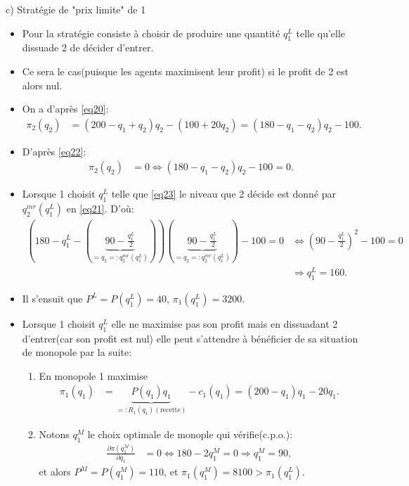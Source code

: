 \begin{frame}[allowframebreaks]{c) Stratégie de "prix limite" de 1}
    \begin{itemize}
        \item Pour la stratégie consiste à choisir de produire une quantité $q_1^L$ telle qu'elle dissuade 2 
        de décider d'entrer. 
        \item Ce sera le cas(puisque les agents maximisent leur profit) si le profit de 2 est alors nul.
        \item On a d'après \eqref{eq20}:
        \begin{align}
            \pi_2(q_2) &= (200 - q_1 + q_2)q_2 - (100 + 20q_2) = (180 - q_1-q_2)q_2 - 100.
         \label{eq22}
        \end{align}
        \item D'après \eqref{eq22}:
        \begin{align}
            \pi_2(q_2) &= 0 \Leftrightarrow  (180 - q_1-q_2)q_2 - 100 = 0.
            \label{eq23}
        \end{align}
        \item Lorsque 1 choisit $q_1^L$ telle que \eqref{eq23} le niveau 
        que 2 décide est donné par $q_2^{mr}(q_1^L)$ en \eqref{eq21}. D'où:
        \begin{align*}
            \left(180-q_1^L - \left(\underbrace{90 - \frac{q_1^L}{2}}_{=q_2=:q_2^{mr}(q_1^L)}\right)\right)\left(
                \underbrace{90 - \frac{q_1^L}{2}}_{=q_2=:q_2^{mr}(q_1^L)}\right) - 100 = 0& \Leftrightarrow 
                \left(90-\frac{q_1^L}{2}\right)^2 -100=0\\
                &\Rightarrow q_1^L = 160.
        \end{align*}
        \item Il s'ensuit que $P^L = P(q_1^L) = 40$, $\pi_1(q_1^L) = 3200$.
        \item Lorsque 1 choisit $q_1^L$ elle ne maximise pas son profit 
        mais en dissuadant 2 d'entrer(car son profit est nul) elle peut 
        s'attendre à bénéficier de sa situation de monopole par la suite:
        \begin{enumerate}[-]
            \item En monopole 1 maximise
            \begin{align*}
                \pi_1(q_1) &= \underbrace{P(q_1)q_1}_{=:R_1(q_1)(\text{recette})} -c_1(q_1) = (200-q_1)q_1 - 20q_1.
            \end{align*}
            \item Notons $q_1^M$ le choix optimale de monople qui vérifie(c.p.o.): 
            \begin{align*}
                \frac{\partial \pi(q_1^M)}{\partial q_1} &= 0 \Leftrightarrow 180-2q_1^M = 0\Rightarrow q_1^M = 90,
            \end{align*}
            et alors $P^M=P(q_1^M) = 110$, et $\pi_1(q_1^M) = 8100 > \pi_1(q_1^L)$.
        \end{enumerate}
    \end{itemize}
    \end{frame}
